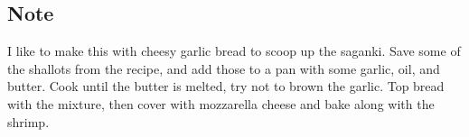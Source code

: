 \subsection{Note}

I like to make this with cheesy garlic bread to scoop up the saganki. Save some of the shallots from the recipe, and add
those to a pan with some garlic, oil, and butter. Cook until the butter is melted, try not to brown the garlic. Top
bread with the mixture, then cover with mozzarella cheese and bake along with the shrimp.
